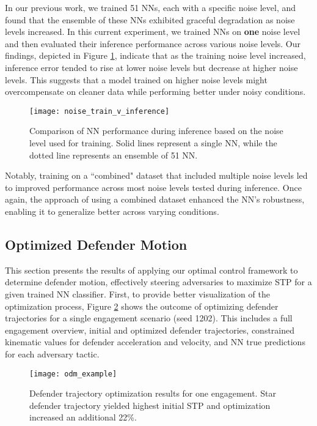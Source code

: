 \documentclass[journal]{IEEEtran} %
\begin{document}
In our previous work, we trained 51 NNs, each with a specific noise level, and found that the ensemble of these NNs exhibited graceful degradation as noise levels increased. In this current experiment, we trained NNs on \textbf{one} noise level and then evaluated their inference performance across various noise levels. Our findings, depicted in Figure \ref{fig:noise_train_v_inference}, indicate that as the training noise level increased, inference error tended to rise at lower noise levels but decrease at higher noise levels. This suggests that a model trained on higher noise levels might overcompensate on cleaner data while performing better under noisy conditions.

\begin{figure}[h]
    \centering
    \texttt{[image: noise\_train\_v\_inference]}
    \caption{Comparison of NN performance during inference based on the noise level used for training. Solid lines represent a single NN, while the dotted line represents an ensemble of 51 NN.}
    \label{fig:noise_train_v_inference}
\end{figure}

Notably, training on a ``combined" dataset that included multiple noise levels led to improved performance across most noise levels tested during inference. Once again, the approach of using a combined dataset enhanced the NN's robustness, enabling it to generalize better across varying conditions.


\subsection{Optimized Defender Motion}


This section presents the results of applying our optimal control framework to determine defender motion, effectively steering adversaries to maximize STP for a given trained NN classifier. First, to provide better visualization of the optimization process, Figure \ref{fig:odm_example} shows the outcome of optimizing defender trajectories for a single engagement scenario (seed 1202). This includes a full engagement overview, initial and optimized defender trajectories, constrained kinematic values for defender acceleration and velocity, and NN true predictions for each adversary tactic.

\begin{figure}[h!]
    \centering
    \texttt{[image: odm\_example]}
    \caption{Defender trajectory optimization results for one engagement. Star defender trajectory yielded highest initial STP and optimization  increased an additional 22\%.}
    \label{fig:odm_example}
\end{figure}
\end{document}
